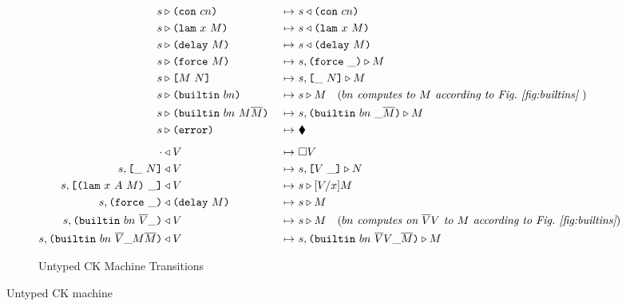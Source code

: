 \documentclass[../plutus-core-specification.tex]{subfiles}
\begin{document}
\begin{figure}[H]
\begin{subfigure}[c]{\linewidth}
\hspace{-1cm}\begin{minipage}{\linewidth}
\begin{alignat*}{2}
        \cksteps{\ckforward{s&}{\con{cn}}&} {&\ckbackward{s}{\con{cn}}}\\
        \cksteps{\ckforward{s&}{\lamU{x}{M}}&} {&\ckbackward{s}{\lamU{x}{M}}}\\
        \cksteps{\ckforward{s&}{\delay{M}}&} {&\ckbackward{s}{\delay{M}}}\\
        \cksteps{\ckforward{s&}{\force{M}}&} {&\ckforward{s, \inForceFrame{}}{M}}\\
        \cksteps{\ckforward{s&}{\appU{M}{N}}&} {&\ckforward{s, \inAppLeftFrame{N}}{M}}\\
        \cksteps{\ckforward{s&}{\builtinU{bn}{\!\!}}&} {&\ckforward{s}{M}}
        \quad (\textit{$bn$ computes to $M$ according to Fig.~\ref{fig:builtins} }) \\
       \cksteps{\ckforward{s&}{\builtinU{bn}{M \repetition{M}}}&} {&\ckforward{s, \inBuiltinU{bn}{}{\_}{\repetition{M}}}{M}}\\
       \cksteps{\ckforward{s&}{\errorU}&} {&\ckerror{}}\\
       \\[-10pt] %
        \cksteps{\ckbackward{\cdot&}{V}&} {&\square V}\\
        \cksteps{\ckbackward{s, \inAppLeftFrame{N}&}{V}&} {&\ckforward{s, \inAppRightFrame{V}}{N}}\\
        \cksteps{\ckbackward{s, \inAppRightFrame{\lam{x}{A}{M}}&}{V}&} {&\ckforward{s}{\subst{V}{x}{M}}}\\
        \cksteps{\ckbackward{s, \inForceFrame{}&}{\delay{M}}&} {&\ckforward{s}{M}}\\
        \cksteps{\ckbackward{s, \inBuiltinU{bn}{\repetition{V}}{\_}{}&}{V}&} {&\ckforward{s}{M}}
          \quad (\textit{$bn$ computes on $\repetition{V}V$ to $M$ according to Fig.~\ref{fig:builtins}})\\
          \cksteps{\ckbackward{s, \inBuiltinU{bn}{\repetition{V}}{\_}{M \repetition{M}}&}{V}&}
                  {&\ckforward{s, \inBuiltinU{bn}{\repetition{V} V}{\_}{\repetition{M}}}{M}}\\
    \end{alignat*}
\end{minipage}
    \caption{Untyped CK Machine Transitions}
    \label{fig:untyped-ck-transitions}
\end{subfigure}
\caption{Untyped CK machine}
\label{fig:untyped-ck-machine}
\end{figure}

\end{document}
